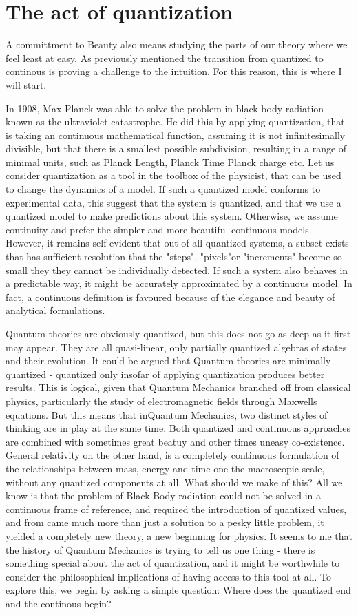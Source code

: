 \documentclass[notitlepage]{report}
\begin{document}
\section*{The act of quantization }
A committment to Beauty also means studying the parts of our theory where we feel least at easy. As previously mentioned the transition from quantized to continous is proving a challenge to the intuition. For this reason, this is where I will start.

In 1908, Max Planck was able to solve the problem in black body radiation known as the ultraviolet catastrophe. He did this by applying quantization, that is taking an continuous mathematical function, assuming it is not infinitesimally divisible, but that there is a smallest possible subdivision, resulting in a range of minimal units, such as Planck Length, Planck Time Planck charge etc. Let us consider quantization as a tool in the toolbox of the physicist, that can be used to change the dynamics of a model. If such a quantized model conforms to experimental data, this suggest that the system is quantized, and that we use a quantized model to make predictions about this system. Otherwise, we assume continuity and prefer the simpler and more beautiful continuous models. However, it remains self evident that out of all quantized systems, a subset exists that has sufficient resolution that the "steps", "pixels"or "increments" become so small they they cannot be individually detected. If such a system also behaves in a predictable way, it might be accurately approximated by a continuous model. In fact, a continuous definition is favoured because of the elegance and beauty of analytical formulations.

Quantum theories are obviously quantized, but this does not go as deep as it first may appear. They are all quasi-linear, only partially quantized algebras of states and their evolution. It could be argued that Quantum theories are minimally quantized - quantized only insofar of applying quantization produces better results. This is logical, given that Quantum Mechanics branched off from classical physics, particularly the study of electromagnetic fields through Maxwells equations. 
But this means that inQuantum Mechanics, two distinct styles of thinking are in play at the same time. Both quantized and continuous approaches are combined with sometimes great beatuy and other times uneasy co-existence. General relativity on the other hand, is a completely continuous formulation of the relationships between mass, energy and time one the macroscopic scale, without any quantized components at all. What should we make of this?
All we know is that the problem of Black Body radiation could not be solved in a continuous frame of reference, and required the introduction of quantized values, and from came much more than just a solution to a pesky little problem, it yielded a completely new theory, a new beginning for physics. It seems to me that the history of Quantum Mechanics is trying to tell us one thing - there is something special about the act of quantization, and it might be worthwhile to consider the philosophical implications of having access to this tool at all. To explore this, we begin by asking a simple question: Where does the quantized end and the continous begin?
\end{document}
